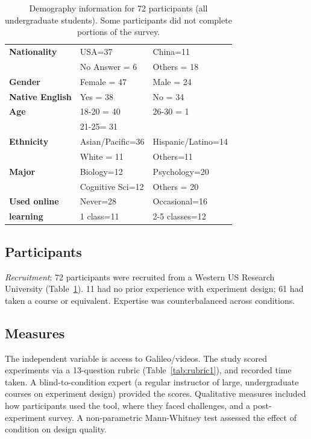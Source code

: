\vspace{0.25in}
\begin{table}[!ht]
\caption[Demography information for 72 participants (all undergraduate students)] 
{Demography  information for 72 participants (all undergraduate students). Some participants did not complete portions of the survey.}

\vspace{-0.25in}
\begin{center}
\renewcommand{\arraystretch}{1.5}
\begin{tabular}{>{\bf}p{1.5in}p{1.75in}p{1.75in}}
\hline
Nationality	&	USA=37		&	China=11\\
			&	No Answer = 6	&	Others = 18\\
Gender		&	Female = 47	&	Male = 24\\
Native English	&	Yes = 38 		&	No = 34\\
Age			&	18-20 = 40	& 	26-30 = 1\\
			&	21-25= 31	&			\\
Ethnicity		&	Asian/Pacific=36 & 	Hispanic/Latino=14\\
			&	White = 11		&	Others=11 \\
Major		&	Biology=12	& 	Psychology=20 \\
			&	Cognitive Sci=12 &	 Others = 20 \\
Used online	& 	Never=28		&	Occasional=16\\
learning		&	1 class=11	&	2-5 classes=12\\
\hline
\end{tabular}
\end{center}
\label{tab:gi-results1}
\end{table}


\subsection*{Participants}
\textit{Recruitment}: 72 participants were recruited from a Western US Research University (Table~\ref{tab:gi-results1}). 11 had no prior experience with experiment design; 61 had taken a course or equivalent. Expertise was counterbalanced across conditions.

\subsection*{Measures}
The independent variable is access to Galileo/videos. The study scored experiments via a 13-question rubric (Table~\ref{tab:rubric1}), and recorded time taken. A blind-to-condition expert (a regular instructor of large, undergraduate courses on experiment design) provided the scores. Qualitative measures included how participants used the tool, where they faced challenges, and a post-experiment survey. A non-parametric Mann-Whitney test assessed the effect of condition on design quality.

